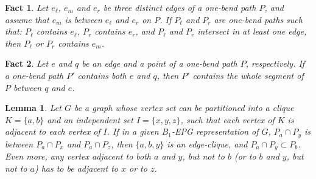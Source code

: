 \documentclass[9pt]{entcs}
\newtheorem{lema}[thm]{Lemma}%
\newtheorem{fac}{Fact}%
\begin{document}
\begin{fac} \label{f:between}Let $e_{\ell}$, $e_m$ and $e_r$  be three distinct edges of a  one-bend path $P$, and assume that $e_m$ is between $e_{\ell}$ and $e_r$ on $P$. If $P_{\ell}$ and $P_r$ are one-bend paths such that: $P_{\ell}$ contains $e_{\ell}$, $P_r$ contains $e_r$, and  $P_{\ell}$ and $P_r$ intersect in at least one edge, then $P_{\ell}$ or $P_r$ contains $e_m$.
\end{fac}
\begin{fac} \label{f:two points} Let  $e$ and $q$  be an edge and a  point  of a  one-bend path $P$, respectively. If a one-bend path $P'$ contains both $e$ and $q$, then $P'$ contains the whole segment of $P$ between $q$ and $e$.
\end{fac}

\begin{lema}\label{l:abclique}
Let $G$ be a graph whose vertex set  can be partitioned into a clique $K=\{a,b\}$ and an independent set $I=\{x,y,z\}$, such that each vertex of $K$ is adjacent to each vertex of $I$.
If in a given $B_1$-EPG representation of $G$, $P_a\cap P_y$ is between $P_a\cap P_x$ and $P_a\cap P_z$, then $\{a,b,y\}$ is an edge-clique, and
$P_a\cap P_y \subset P_b$. Even more, any vertex adjacent to both $a$ and $y$, but not to $b$ (or to $b$ and $y$, but not to $a$) has to be adjacent to $x$ or to $z$.
\end{lema}
\end{document}
